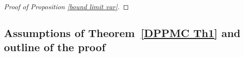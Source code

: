 \documentclass[a4paper,11pt]{article}
\numberwithin{equation}{section}
\theoremstyle{definition}
\newcommand{\eq}{\begin{equation}}
\newcommand{\qe}{\end{equation}}
\newcommand{\N}{\mathbb{N}}
\newcommand{\R}{\mathbb{R}}
\newcommand{\bs}{\boldsymbol}
\renewcommand{\leq}{\leqslant}
\renewcommand{\d}{ {\rm d}}
\begin{document}
\begin{proof}[Proof of Proposition \ref{bound limit var}]
\end{proof}


\subsection{Assumptions of Theorem~\ref{DPPMC Th1} and  outline of the proof }
\label{reg cond Th2}
\end{document}
